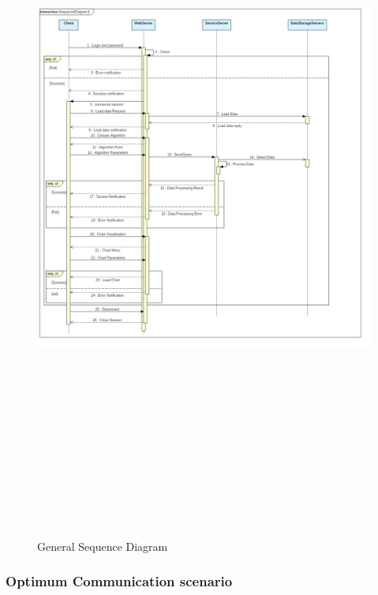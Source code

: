 \newpage
\begin{figure}[!ht]
\begin{center}
\includegraphics[width=17cm,height=24cm]{chapter4/sequence.png}
\end{center}
\caption{General Sequence Diagram}
\label{seq0}
\end{figure}
\subsubsection{Optimum Communication scenario}

